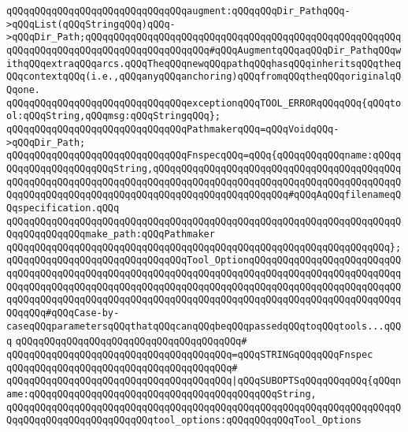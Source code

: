 \newline
\verb|qQQqqQQqqQQqqQQqqQQqqQQqqQQqqQQqaugment:qQQqqQQqDir_PathqQQq->qQQqList(qQQqStringqQQq)qQQq->qQQqDir_Path;qQQqqQQqqQQqqQQqqQQqqQQqqQQqqQQqqQQqqQQqqQQqqQQqqQQqqQQqqQQqqQQqqQQqqQQqqQQqqQQqqQQqqQQqqQQq#qQQqAugmentqQQqaqQQqDir_PathqQQqwithqQQqextraqQQqarcs.qQQqTheqQQqnewqQQqpathqQQqhasqQQqinheritsqQQqtheqQQqcontextqQQq(i.e.,qQQqanyqQQqanchoring)qQQqfromqQQqtheqQQqoriginalqQQqone.|\newline
\newline
\verb|qQQqqQQqqQQqqQQqqQQqqQQqqQQqqQQqexceptionqQQqTOOL_ERRORqQQqqQQq{qQQqtool:qQQqString,qQQqmsg:qQQqStringqQQq};|\newline
\newline
\verb|qQQqqQQqqQQqqQQqqQQqqQQqqQQqqQQqPathmakerqQQq=qQQqVoidqQQq->qQQqDir_Path;|\newline
\newline
\verb|qQQqqQQqqQQqqQQqqQQqqQQqqQQqqQQqFnspecqQQq=qQQq{qQQqqQQqqQQqname:qQQqqQQqqQQqqQQqqQQqqQQqString,qQQqqQQqqQQqqQQqqQQqqQQqqQQqqQQqqQQqqQQqqQQqqQQqqQQqqQQqqQQqqQQqqQQqqQQqqQQqqQQqqQQqqQQqqQQqqQQqqQQqqQQqqQQqqQQqqQQqqQQqqQQqqQQqqQQqqQQqqQQqqQQqqQQqqQQqqQQqqQQqqQQq#qQQqAqQQqfilenameqQQqspecification.qQQq|\newline
\verb|qQQqqQQqqQQqqQQqqQQqqQQqqQQqqQQqqQQqqQQqqQQqqQQqqQQqqQQqqQQqqQQqqQQqqQQqqQQqqQQqqQQqmake_path:qQQqPathmaker|\newline
\verb|qQQqqQQqqQQqqQQqqQQqqQQqqQQqqQQqqQQqqQQqqQQqqQQqqQQqqQQqqQQqqQQqqQQq};|\newline
\newline
\verb|qQQqqQQqqQQqqQQqqQQqqQQqqQQqqQQqTool_OptionqQQqqQQqqQQqqQQqqQQqqQQqqQQqqQQqqQQqqQQqqQQqqQQqqQQqqQQqqQQqqQQqqQQqqQQqqQQqqQQqqQQqqQQqqQQqqQQqqQQqqQQqqQQqqQQqqQQqqQQqqQQqqQQqqQQqqQQqqQQqqQQqqQQqqQQqqQQqqQQqqQQqqQQqqQQqqQQqqQQqqQQqqQQqqQQqqQQqqQQqqQQqqQQqqQQqqQQqqQQqqQQqqQQqqQQqqQQqqQQqqQQq#qQQqCase-by-caseqQQqparametersqQQqthatqQQqcanqQQqbeqQQqpassedqQQqtoqQQqtools...qQQq|\newline
\verb|qQQqqQQqqQQqqQQqqQQqqQQqqQQqqQQqqQQqqQQq#|\newline
\verb|qQQqqQQqqQQqqQQqqQQqqQQqqQQqqQQqqQQqqQQq=qQQqSTRINGqQQqqQQqFnspec|\newline
\verb|qQQqqQQqqQQqqQQqqQQqqQQqqQQqqQQqqQQqqQQq#|\newline
\verb|qQQqqQQqqQQqqQQqqQQqqQQqqQQqqQQqqQQqqQQq|\verb#|qQQqSUBOPTSqQQqqQQqqQQq{qQQqname:qQQqqQQqqQQqqQQqqQQqqQQqqQQqqQQqqQQqqQQqqQQqString,#\newline
\verb|qQQqqQQqqQQqqQQqqQQqqQQqqQQqqQQqqQQqqQQqqQQqqQQqqQQqqQQqqQQqqQQqqQQqqQQqqQQqqQQqqQQqqQQqqQQqqQQqtool_options:qQQqqQQqqQQqTool_Options|\newline
